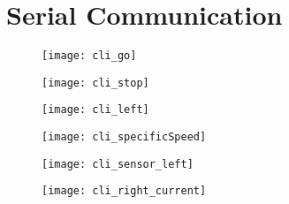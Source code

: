 \graphicspath{{content/3_results/figures}}
\section{Serial Communication}

\begin{figure}[!htb]
    \centering
    \begin{minipage}{.45\textwidth}
        \centering
        \texttt{[image: cli\_go]}
        \label{fig:cli_go}
    \end{minipage}
    \begin{minipage}{.45\textwidth}
        \centering
        \texttt{[image: cli\_stop]}
        \label{fig:cli_stop}
    \end{minipage}
\end{figure}

\begin{figure}[!htb]
    \centering
    \begin{minipage}{.45\textwidth}
        \centering
        \texttt{[image: cli\_left]}
        \label{fig:cli_left}
    \end{minipage}
    \begin{minipage}{.45\textwidth}
        \centering
        \texttt{[image: cli\_specificSpeed]}
        \label{fig:cli_specificSpeed}
    \end{minipage}
\end{figure}

\begin{figure}[!htb]
    \centering
    \begin{minipage}{.45\textwidth}
        \centering
        \texttt{[image: cli\_sensor\_left]}
        \label{fig:cli_sensor_left}
    \end{minipage}
    \begin{minipage}{.45\textwidth}
        \centering
        \texttt{[image: cli\_right\_current]}
        \label{fig:cli_right_current}
    \end{minipage}
\end{figure}